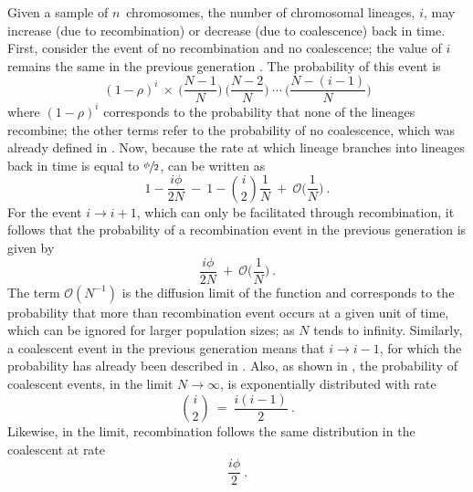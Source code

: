 Given a sample of $n$~chromosomes, the number of chromosomal lineages, $i$, may increase (due to recombination) or decrease (due to coalescence) back in time.
First, consider the event of no recombination and no coalescence; \ie the value of $i$ remains the same in the previous generation \citep[\eg, see][]{tavare2004}.
The probability of this event is
\begin{equation}\label{eq:coalrec_dont1}
	(1-\rho)^i~\times~\Big(\frac{N-1}{N} \Big)~\Big(\frac{N-2}{N}\Big)~\cdots~\Big(\frac{N-(i-1)}{N}\Big)
\end{equation}
where ${(1 - \rho)^i}$ corresponds to the probability that none of the lineages recombine; the other terms refer to the probability of no coalescence, which was already defined in .
Now, because the rate at which  lineage branches into  lineages back in time is equal to $\sfrac{\phi}{2}$,  can be written as
\begin{equation}\label{eq:coalrec_dont2}
	1-\frac{i\phi}{2N}~-~1-{i \choose 2}\frac{1}{N}~+~\mathcal{O}\Big(\frac{1}{N}\Big)
	\ \text{.}
\end{equation}
For the event ${i\rightarrow i+1}$, which can only be facilitated through recombination, it follows that the probability of a recombination event in the previous generation is given by
\begin{equation}
	\frac{i\phi}{2N}~+~\mathcal{O}\Big(\frac{1}{N}\Big)
	\ \text{.}
\end{equation}
The term ${\mathcal{O}(N^{-1})}$ is the diffusion limit of the function and corresponds to the probability that more than  recombination event occurs at a given unit of time, which can be ignored for larger population sizes; \ie as $N$ tends to infinity.
Similarly, a coalescent event in the previous generation means that ${i \rightarrow i-1}$, for which the probability has already been described in .
Also, as shown in , the probability of coalescent events, in the limit ${N\rightarrow\infty}$, is exponentially distributed with rate
\begin{equation}
	{i\choose 2}~=~\frac{i(i-1)}{2}
	\ \text{.}
\end{equation}
Likewise, in the limit, recombination follows the same distribution in the coalescent at rate
\begin{equation}
	\frac{i\phi}{2}
	\ \text{.}
\end{equation}

